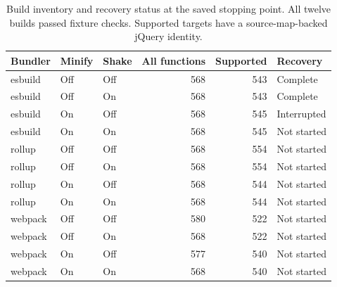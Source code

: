 \begin{table}[t]
\caption{Build inventory and recovery status at the saved stopping point. All twelve builds passed fixture checks. Supported targets have a source-map-backed jQuery identity.}
\label{tab:matrix}
\centering\small
\begin{tabular}{lllrrl}
\toprule
Bundler & Minify & Shake & All functions & Supported & Recovery\\
\midrule
esbuild & Off & Off & 568 & 543 & Complete\\
esbuild & Off & On & 568 & 543 & Complete\\
esbuild & On & Off & 568 & 545 & Interrupted\\
esbuild & On & On & 568 & 545 & Not started\\
rollup & Off & Off & 568 & 554 & Not started\\
rollup & Off & On & 568 & 554 & Not started\\
rollup & On & Off & 568 & 544 & Not started\\
rollup & On & On & 568 & 544 & Not started\\
webpack & Off & Off & 580 & 522 & Not started\\
webpack & Off & On & 568 & 522 & Not started\\
webpack & On & Off & 577 & 540 & Not started\\
webpack & On & On & 568 & 540 & Not started\\
\bottomrule
\end{tabular}
\end{table}
